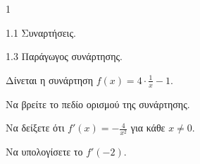 \begin{ylh}{1}
    \item 1.1 Συναρτήσεις.
    \item 1.3 Παράγωγος συνάρτησης.
\end{ylh}
Δίνεται η συνάρτηση $f(x) = 4 \cdot \frac{1}{x} - 1$.
\begin{alist}
    \item Να βρείτε το πεδίο ορισμού της συνάρτησης. 
    \item Να δείξετε ότι $f'(x) = -\frac{4}{x^2}$ για κάθε $x \neq 0$. 
    \item Να υπολογίσετε το $f'(-2)$. 
\end{alist}

